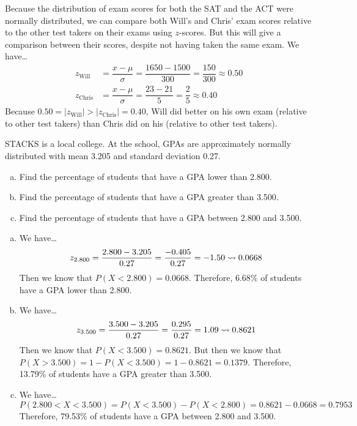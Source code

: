 \documentclass[11pt,letterpaper]{article}
\begin{document}
\sol Because the distribution of exam scores for both the SAT and the ACT were normally distributed, we can compare both Will's and Chris' exam scores relative to the other test takers on their exams using $z$-scores. But this will give a comparison between their scores, despite not having taken the same exam. We have\dots
	\[
	\begin{aligned}
	z_{\text{Will}}&= \dfrac{x - \mu}{\sigma}= \dfrac{1650 - 1500}{300}= \dfrac{150}{300} \approx 0.50 \\[0.3cm]
	z_{\text{Chris}}&= \dfrac{x - \mu}{\sigma}= \dfrac{23 - 21}{5}= \dfrac{2}{5} \approx 0.40 
	\end{aligned}
	\]
Because $0.50= |z_{\text{Will}}| > |z_{\text{Chris}}|= 0.40$, Will did better on his own exam (relative to other test takers) than Chris did on his (relative to other test takers). 



\newpage



 STACKS is a local college. At the school, GPAs are approximately normally distributed with mean 3.205 and standard deviation 0.27. 
	\begin{enumerate}[(a)]
	\item Find the percentage of students that have a GPA lower than 2.800.
	\item Find the percentage of students that have a GPA greater than 3.500. 
	\item Find the percentage of students that have a GPA between 2.800 and 3.500. 
	\end{enumerate} \pspace

\sol 
\begin{enumerate}[(a)]
\item We have\dots
	\[
	z_{2.800}= \dfrac{2.800 - 3.205}{0.27}= \dfrac{-0.405}{0.27}= -1.50 \rightsquigarrow 0.0668
	\] 
Then we know that $P(X < 2.800)= 0.0668$. Therefore, 6.68\% of students have a GPA lower than 2.800. \pspace

\item We have\dots
	\[
	z_{3.500}= \dfrac{3.500 - 3.205}{0.27}= \dfrac{0.295}{0.27}= 1.09 \rightsquigarrow 0.8621
	\] 
Then we know that $P(X < 3.500)= 0.8621$. But then we know that $P(X > 3.500)= 1 - P(X < 3.500)= 1 - 0.8621= 0.1379$. Therefore, 13.79\% of students have a GPA greater than 3.500. \pspace

\item We have\dots
	\[
	P(2.800 < X < 3.500)= P(X < 3.500) - P(X < 2.800)= 0.8621 - 0.0668= 0.7953
	\]
Therefore, 79.53\% of students have a GPA between 2.800 and 3.500. 
\end{enumerate}
\end{document}
